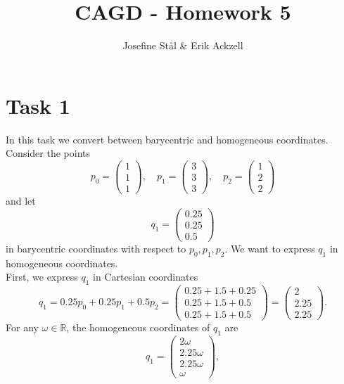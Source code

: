 \documentclass[]{article}
\title{CAGD - Homework 5}
\author{Josefine St{\aa}l \& Erik Ackzell}
\begin{document}
\maketitle

\section*{Task 1}
In this task we convert between barycentric and homogeneous coordinates.\\
Consider the points \begin{equation*}
p_0 = \left(\begin{array}{c}
1\\
1\\
1
\end{array}\right), \quad
p_1 = \left(\begin{array}{c}
3\\
3\\
3
\end{array}\right), \quad
p_2 = \left(\begin{array}{c}
1\\
2\\
2
\end{array}\right)
\end{equation*}
and let \begin{equation*}
q_1=\left(\begin{array}{c}
0.25\\
0.25\\
0.5
\end{array}\right)
\end{equation*}
in barycentric coordinates with respect to $p_0, p_1, p_2$. We want to express $q_1$ in homogeneous coordinates.\\
First, we express $q_1$ in Cartesian coordinates \begin{equation*}
q_1 = 0.25p_0 + 0.25p_1 + 0.5p_2 = \left(\begin{array}{c}
0.25 + 1.5 + 0.25\\
0.25 + 1.5 + 0.5\\
0.25 + 1.5 + 0.5
\end{array}\right) = \left(\begin{array}{c}
2\\
2.25\\
2.25
\end{array}\right).
\end{equation*}
For any $\omega\in\mathbb{R}$, the homogeneous coordinates of $q_1$ are\begin{equation*}
q_1 = \left(\begin{array}{c}
2\omega\\
2.25\omega\\
2.25\omega\\
\omega
\end{array}\right),
\end{equation*}
\end{document}
